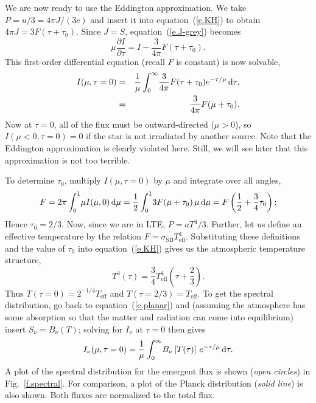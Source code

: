 We are now ready to use the Eddington approximation.  We take $P = u/3 = 4\pi J/(3c)$ and insert it into equation~(\ref{e.KH}) to obtain $4\pi J = 3F(\tau + \tau_{0})$. Since $J = S$, equation~(\ref{e.J-grey}) becomes
\begin{equation}
\mu\frac{\partial I}{\partial\tau} = I - \frac{3}{4\pi}F(\tau+\tau_{0}).
\end{equation}
This first-order differential equation (recall $F$ is constant) is now solvable,
\begin{eqnarray}
I(\mu,\tau=0) &=& \frac{1}{\mu}\int_{0}^{\infty}\!\frac{3}{4\pi}F(\tau + \tau_{0}) e^{-\tau/\mu}\,\mathrm{d}\tau,\nonumber\\
  &=& \frac{3}{4\pi}F(\mu + \tau_{0}).
\end{eqnarray}
Now at $\tau = 0$, all of the flux must be outward-directed ($\mu >0$), so $I(\mu < 0,\tau = 0) = 0$ if the star is not irradiated by another source.  Note that the Eddington approximation is clearly violated here.  Still, we will see later that this approximation is not too terrible. 

To determine $\tau_{0}$, multiply $I(\mu,\tau = 0)$ by $\mu$ and integrate over all angles,
\begin{equation}
F = 2\pi\int_{0}^{1}\!\mu I(\mu,0)\,\mathrm{d}\mu = \frac{1}{2}\int_{0}^{1}\!3F(\mu + \tau_{0})\,\mu\,\mathrm{d}\mu = F\left(\frac{1}{2} + \frac{3}{4}\tau_{0}\right);
\end{equation}
Hence $\tau_{0} = 2/3$. Now, since we are in LTE, $P = aT^{4}/3$. Further, let us define an effective temperature by the relation $F = \sigma_{\mathrm{SB}}T_{\mathrm{eff}}^{4}$.  Substituting these definitions and the value of $\tau_{0}$ into equation~(\ref{e.KH}) gives us the atmospheric temperature structure,
\begin{equation}\label{e.Eddington}
T^{4}(\tau) = \frac{3}{4}T_{\mathrm{eff}}^{4}\left(\tau + \frac{2}{3}\right).
\end{equation}
Thus $T(\tau  = 0) = 2^{-1/4} T_{\mathrm{eff}}$ and $T(\tau = 2/3) = T_{\mathrm{eff}}$.  To get the spectral distribution, go back to equation~(\ref{e.planar}) and (assuming the atmosphere has some absorption so that the matter and radiation can come into equilibrium) insert $S_{\nu} = B_{\nu}(T)$; solving for $I_{\nu}$ at $\tau = 0$ then gives
\begin{equation}\label{e.spectral}
I_{\nu}(\mu,\tau=0) = \frac{1}{\mu}\int_{0}^{\infty}\!B_{\nu}\left[T(\tau)\right] \, e^{-\tau/\mu}\,\mathrm{d}\tau.
\end{equation}
A plot of the spectral distribution for the emergent flux is shown (\emph{open circles}) in Fig.~\ref{f.spectral}. For comparison, a plot of the Planck distribution (\emph{solid line}) is also shown. Both fluxes are normalized to the total flux.

